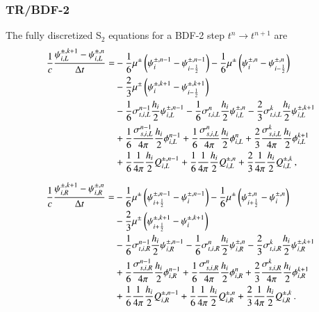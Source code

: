\documentclass[preprint,12pt]{elsarticle}
\begin{document}
\subsubsection{TR/BDF-2}
The fully discretized S$_2$ equations for a BDF-2 step
$t^{n}\rightarrow t^{n+1}$ are
\begin{equation}\begin{split}
\frac{1}{c}\frac{\psi\iL^{\pm,k+1}-\psi\iL^{\pm,n}}{\dt} = &
   -\sixth\mu^\pm\fn{\psi^{\pm,n-1}_i - \psi^{\pm,n-1}_{i-\half}}
   -\sixth\mu^\pm\fn{\psi^{\pm,n}_i - \psi^{\pm,n}_{i-\half}}\\
  &-\frac{2}{3}\mu^\pm\fn{\psi^{\pm,k+1}_i - \psi^{\pm,k+1}_{i-\half}}\\
  &-\sixth\sigma_{t,i,L}^{n-1}\frac{h_i}{2}\psi\iL^{\pm,n-1}
   -\sixth\sigma_{t,i,L}^{n}  \frac{h_i}{2}\psi\iL^{\pm,n}
   -\frac{2}{3}\sigma_{t,i,L}^k\frac{h_i}{2}\psi\iL^{\pm,k+1}\\
  &+\sixth\frac{\sigma_{s,i,L}^{n-1}}{4\pi}\frac{h_i}{2}\phi\iL^{n-1}
   +\sixth\frac{\sigma_{s,i,L}^{n}}{4\pi}  \frac{h_i}{2}\phi\iL^{n}
   +\frac{2}{3}\frac{\sigma_{s,i,L}^k}{4\pi}\frac{h_i}{2}\phi\iL^{k+1}\\
  &+\sixth\frac{1}{4\pi}\frac{h_i}{2}Q_{i,L}^{\pm,n-1}
   +\sixth\frac{1}{4\pi}\frac{h_i}{2}Q_{i,L}^{\pm,n}
   +\frac{2}{3}\frac{1}{4\pi}\frac{h_i}{2}Q_{i,L}^{\pm,k} \pec
\lequ{S2BDF2fullL}
\end{split}\end{equation}

\begin{equation}\begin{split}
\frac{1}{c}\frac{\psi\iR^{\pm,k+1}-\psi\iR^{\pm,n}}{\dt} = &
   -\sixth\mu^\pm\fn{\psi^{\pm,n-1}_{i+\half}      - \psi^{\pm,n-1}_i}
   -\sixth\mu^\pm\fn{\psi^{\pm,n}_{i+\half}        - \psi^{\pm,n}_i}\\
  &-\frac{2}{3}\mu^\pm\fn{\psi^{\pm,k+1}_{i+\half} - \psi^{\pm,k+1}_i}\\
  &-\sixth\sigma_{t,i,R}^{n-1}\frac{h_i}{2}\psi\iR^{\pm,n-1}
   -\sixth\sigma_{t,i,R}^{n}  \frac{h_i}{2}\psi\iR^{\pm,n}
   -\frac{2}{3}\sigma_{t,i,R}^k\frac{h_i}{2}\psi\iR^{\pm,k+1}\\
  &+\sixth\frac{\sigma_{s,i,R}^{n-1}}{4\pi}\frac{h_i}{2}\phi\iR^{n-1}
   +\sixth\frac{\sigma_{s,i,R}^{n}}{4\pi}  \frac{h_i}{2}\phi\iR^{n}
   +\frac{2}{3}\frac{\sigma_{s,i,R}^k}{4\pi}\frac{h_i}{2}\phi\iR^{k+1}\\
  &+\sixth\frac{1}{4\pi}\frac{h_i}{2}Q_{i,R}^{\pm,n-1}
   +\sixth\frac{1}{4\pi}\frac{h_i}{2}Q_{i,R}^{\pm,n}
   +\frac{2}{3}\frac{1}{4\pi}\frac{h_i}{2}Q_{i,R}^{\pm,k} \pep
\lequ{S2BDF2fullR}
\end{split}\end{equation}
\end{document}
